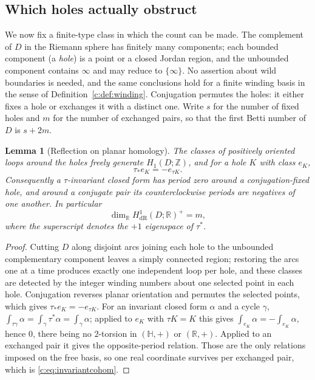 \documentclass[11pt,a4paper]{article}
\numberwithin{equation}{section}
\newtheorem{lemma}[theorem]{Lemma}
\theoremstyle{definition}
\theoremstyle{remark}
\theoremstyle{plain}
\newcommand{\HH}{\mathbb H}
\newcommand{\RR}{\mathbb R}
\newcommand{\ZZ}{\mathbb Z}
\begin{document}
\subsection{Which holes actually obstruct}

We now fix a finite-type class in which the count can be made.  The
complement of $D$ in the Riemann sphere has finitely many components;
each bounded component (a \emph{hole}) is a point or a closed Jordan
region, and the unbounded component contains $\infty$ and may reduce to
$\{\infty\}$.  No assertion about wild boundaries is needed, and the
same conclusions hold for a finite winding basis in the sense of
Definition~\ref{c:def:winding}.  Conjugation permutes the holes: it
either fixes a hole or exchanges it with a distinct one.  Write $s$ for
the number of fixed holes and $m$ for the number of exchanged pairs, so
that the first Betti number of $D$ is $s+2m$.

\begin{lemma}[Reflection on planar homology]
\label{c:lem:reflection}
The classes of positively oriented loops around the holes freely generate
$H_1(D;\ZZ)$, and for a hole $K$ with class $e_K$,
\[
  \tau_*e_K=-e_{\tau K}.
\]
Consequently a $\tau$-invariant closed form has period zero around a
conjugation-fixed hole, and around a conjugate pair its counterclockwise
periods are negatives of one another.  In particular
\begin{equation}
  \dim_{\RR}H^1_{\mathrm{dR}}(D;\RR)^{+}=m,
  \label{c:eq:invariantcohom}
\end{equation}
where the superscript denotes the $+1$ eigenspace of $\tau^*$.
\end{lemma}

\begin{proof}
Cutting $D$ along disjoint arcs joining each hole to the unbounded
complementary component leaves a simply connected region; restoring the
arcs one at a time produces exactly one independent loop per hole, and
these classes are detected by the integer winding numbers about one
selected point in each hole.  Conjugation reverses planar orientation and
permutes the selected points, which gives $\tau_*e_K=-e_{\tau K}$.  For
an invariant closed form $\alpha$ and a cycle $\gamma$,
$\int_{\tau\gamma}\alpha=\int_\gamma\tau^*\alpha=\int_\gamma\alpha$;
applied to $e_K$ with $\tau K=K$ this gives
$\int_{e_K}\alpha=-\int_{e_K}\alpha$, hence $0$, there being no
$2$-torsion in $(\HH,+)$ or $(\RR,+)$.  Applied to an exchanged pair it
gives the opposite-period relation.  Those are the only relations imposed
on the free basis, so one real coordinate survives per exchanged pair,
which is \eqref{c:eq:invariantcohom}.
\end{proof}
\end{document}
